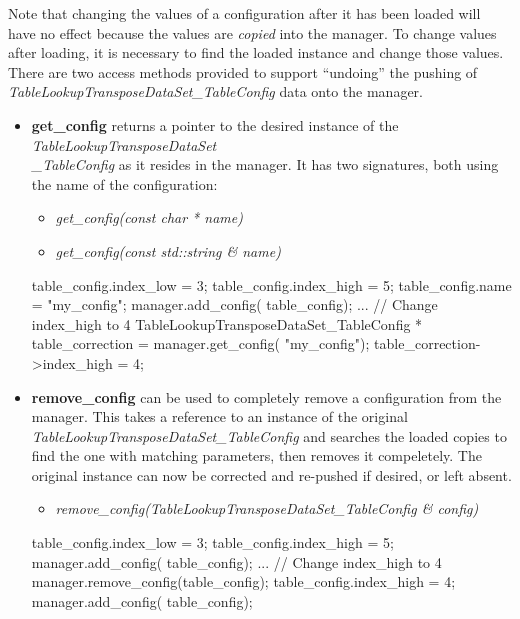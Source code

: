 \documentclass[11pt,fleqn]{report}
\begin{document}
Note that changing the values of a configuration after it has been loaded
will have no effect because the values are \textit{copied} into the manager.
To change values after loading, it is necessary to find the loaded instance
and change those values.
There are two access methods provided to support ``undoing'' the pushing of
\textit{TableLookupTransposeDataSet\_TableConfig} data onto the manager.
\begin{itemize}
\item \textbf{get\_config} returns a pointer to the desired instance of the
      \textit{TableLookupTransposeDataSet\\\_TableConfig} as it resides in the
      manager.  It has two signatures, both using the name of the
      configuration:
      \begin{itemize}
      \item \textit{get\_config(const char * name)}
      \item \textit{get\_config(const std::string \& name)}
      \end{itemize}
\begin{code}
table_config.index_low = 3;
table_config.index_high = 5;
table_config.name = "my_config";
manager.add_config( table_config);
...
// Change index_high to 4
TableLookupTransposeDataSet_TableConfig * table_correction
     = manager.get_config( "my_config");
table_correction->index_high = 4;
\end{code}
\item \textbf{remove\_config} can be used to completely remove a configuration
      from the manager.  This takes a reference to an instance of the original
      \textit{TableLookupTransposeDataSet\_TableConfig} and searches the
      loaded copies to find the one with matching parameters, then removes it
      compeletely.  The original instance can now be corrected and re-pushed if
      desired, or left absent.
      \begin{itemize}
      \item \textit{remove\_config(TableLookupTransposeDataSet\_TableConfig
             \& config)}
      \end{itemize}
\begin{code}
table_config.index_low = 3;
table_config.index_high = 5;
manager.add_config( table_config);
...
// Change index_high to 4
manager.remove_config(table_config);
table_config.index_high = 4;
manager.add_config( table_config);
\end{code}
\end{itemize}
\end{document}
